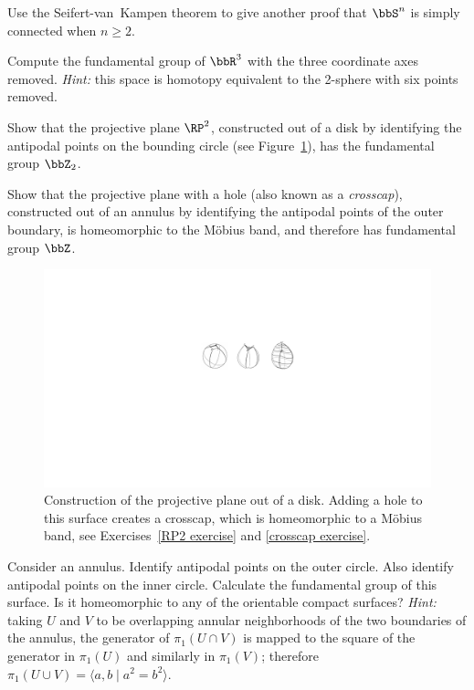 \begin{xca}{{{\cite[Exercise 10-1]{LeeTop}}}}
    Use the Seifert-van~Kampen theorem to give another proof that $\bbS^n$ is simply connected when $n \geq 2$.
\end{xca}
\begin{xca}{{{\cite[Excercise 10-5]{LeeTop}}}}
    Compute the fundamental group of $\bbR^3$ with the three coordinate axes removed. \emph{Hint:} this space is homotopy equivalent to the 2-sphere with six points removed.
\end{xca}
\begin{xca}\label{RP2 exercise}
    Show that the projective plane $\RP^2$, constructed out of a disk by identifying the antipodal points on the bounding circle (see Figure~\ref{fig:crosscap}), has the fundamental group $\bbZ_2$.
\end{xca}
\begin{xca}[Crosscap]\label{crosscap exercise}
    Show that the projective plane with a hole (also known as a \emph{crosscap}), constructed out of an annulus by identifying the antipodal points of the outer boundary, is homeomorphic to the M\"obius band, and therefore has fundamental group $\bbZ$.
\end{xca}
\begin{figure}[tp]
    \centering
    \includegraphics[scale=0.6]{figures/crosscap.pdf}
    \caption{Construction of the projective plane out of a disk. Adding a hole to this surface creates a crosscap, which is homeomorphic to a M\"obius band, see Exercises~\ref{RP2 exercise} and \ref{crosscap exercise}.}
    \label{fig:crosscap}
\end{figure}
\begin{example}{{{\cite[Exercise III.3]{Bredon}}}}
    Consider an annulus. Identify antipodal points on the outer circle. Also identify antipodal points on the inner circle. Calculate the fundamental group of this surface. Is it homeomorphic to any of the orientable compact surfaces? \emph{Hint:} taking $U$ and $V$ to be overlapping annular neighborhoods of the two boundaries of the annulus, the generator of $\pi_1(U\cap V)$ is mapped to the square of the generator in $\pi_1(U)$ and similarly in $\pi_1(V)$; therefore $\pi_1(U\cup V)=\langle a,b\mid a^2=b^2\rangle$.
\end{example}
